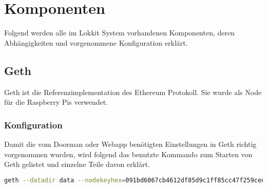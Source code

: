 \section{Komponenten}
\label{sys_sec:Komponenten}
Folgend werden alle im Lokkit System vorhandenen Komponenten, deren Abhängigkeiten und vorgenommene Konfiguration erklärt.

\subsection{Geth}
\label{sys_subsec:Geth}
Geth ist die Referenzimplementation des Ethereum Protokoll. Sie wurde als Node für die Raspberry Pis verwendet.\cite{go-ethereum}

\subsubsection{Konfiguration}
Damit die vom Doorman oder Webapp benötigten Einstellungen in Geth richtig vorgenommen wurden, wird folgend das benutzte Kommando zum Starten von Geth gelistet und einzelne Teile davon erklärt.
\begin{lstlisting}[language=bash,caption={Beispielkommando für das Starten einer Node für Doorman oder Webapp}]
geth --datadir data --nodekeyhex=091bd6067cb4612df85d9c1ff85cc47f259ced4d4cd99816b14f35650f59c322 --rpc --rpcport 8545 --rpcaddr "127.0.0.1" --verbosity 4 -shh --rpcapi "ws,eth,net,web3,admin,personal,shh" --networkid 42 --ipcpath lokkit  --port "30303" --lightserv 50 --vmodule p2p=4 --rpccorsdomain "*"
\end{lstlisting}

